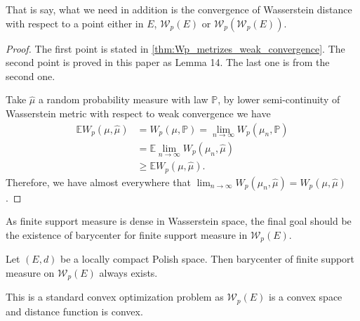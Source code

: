 That is say, what we need in addition is the convergence of Wasserstein distance with respect to a point either in $E$, $\mathcal{W}_p(E)$ or $\mathcal{W}_p(\mathcal{W}_p(E))$.

\begin{proof}
	The first point is stated in \cref{thm:Wp_metrizes_weak_convergence}. The second point is proved in this paper as Lemma 14. The last one is from the second one.

	Take $\hat{\mu}$ a random probability measure with law $\mathbb{P}$, by lower semi-continuity of Wasserstein metric with respect to weak convergence we have
	\begin{align*}
		\mathbb{E}W_p(\mu, \hat{\mu}) & =W_p(\mu, \mathbb{P})=\lim_{n \rightarrow \infty} W_p(\mu_n, \mathbb{P}) \\
		                              & = \mathbb{E}\lim_{n \rightarrow \infty} W_p(\mu_n, \hat{\mu})           \\
		                              & \geq \mathbb{E}W_p(\mu, \hat{\mu}).
	\end{align*}
	Therefore, we have almost everywhere that $\lim_{n \rightarrow \infty} W_p(\mu_n, \hat{\mu})=W_p(\mu, \hat{\mu})$.
\end{proof}

As finite support measure is dense in Wasserstein space, the final goal should be the existence of barycenter for finite support measure in $\mathcal{W}_p(E)$.

\begin{thm}
	Let $(E,d)$ be a locally compact Polish space. Then barycenter of finite support measure on $\mathcal{W}_p(E)$ always exists.
\end{thm}

This is a standard convex optimization problem as $\mathcal{W}_p(E)$ is a convex space and distance function is convex.

